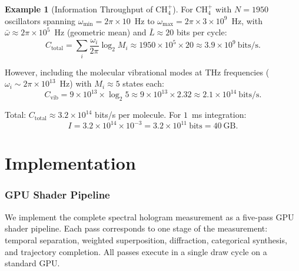 \documentclass[11pt,twocolumn,a4paper]{article}
\theoremstyle{definition}
\newtheorem{example}[theorem]{Example}
\theoremstyle{remark}
\begin{document}
\begin{example}[Information Throughput of CH$_4^+$]
\label{ex:throughput}
For CH$_4^+$ with $N = 1950$ oscillators spanning $\omega_{\min} = 2\pi \times 10$~Hz to $\omega_{\max} = 2\pi \times 3 \times 10^9$~Hz, with $\bar{\omega} \approx 2\pi \times 10^5$~Hz (geometric mean) and $\bar{L} \approx 20$ bits per cycle:
\begin{equation}
C_{\mathrm{total}} = \sum_i \frac{\omega_i}{2\pi} \log_2 M_i \approx 1950 \times 10^5 \times 20 \approx 3.9 \times 10^9~\mathrm{bits/s}.
\end{equation}

However, including the molecular vibrational modes at THz frequencies ($\omega_i \sim 2\pi \times 10^{13}$~Hz) with $M_i \approx 5$ states each:
\begin{equation}
C_{\mathrm{vib}} = 9 \times 10^{13} \times \log_2 5 \approx 9 \times 10^{13} \times 2.32 \approx 2.1 \times 10^{14}~\mathrm{bits/s}.
\end{equation}

Total: $C_{\mathrm{total}} \approx 3.2 \times 10^{14}$ bits/s per molecule. For $1$~ms integration:
\begin{equation}
I = 3.2 \times 10^{14} \times 10^{-3} = 3.2 \times 10^{11}~\mathrm{bits} = 40~\mathrm{GB}.
\end{equation}
\end{example}


\part{Implementation}

\section{GPU Shader Pipeline}
\label{sec:gpu}

We implement the complete spectral hologram measurement as a five-pass GPU shader pipeline. Each pass corresponds to one stage of the measurement: temporal separation, weighted superposition, diffraction, categorical synthesis, and trajectory completion. All passes execute in a single draw cycle on a standard GPU.
\end{document}

